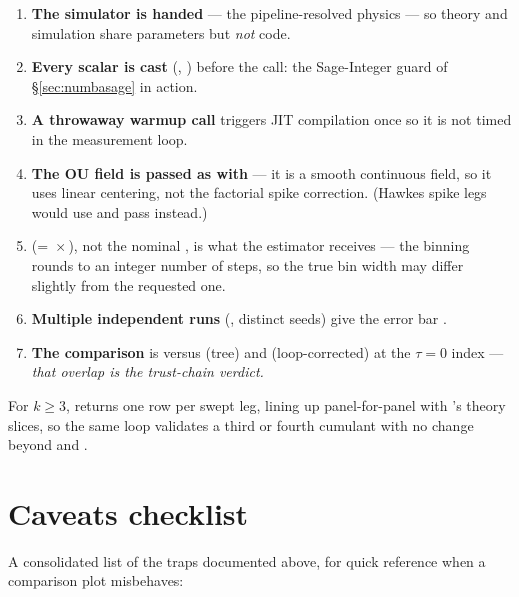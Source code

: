 \begin{enumerate}
  \item \textbf{The simulator is handed } ---
        the pipeline-resolved physics --- so theory and simulation share parameters
        but \emph{not} code.
  \item \textbf{Every scalar is cast} (, )
        before the  call: the Sage-Integer guard of \S\ref{sec:numbasage}
        in action.
  \item \textbf{A throwaway warmup call} triggers JIT compilation once so it is not
        timed in the measurement loop.
  \item \textbf{The OU field is passed as  with
        } --- it is a smooth continuous field, so it uses
        linear centering, not the factorial spike correction. (Hawkes spike legs
        would use  and pass  instead.)
  \item \textbf{} (= \,$\times$\,),
        not the nominal , is what the estimator receives --- the
        binning rounds  to an integer number of steps, so the
        true bin width may differ slightly from the requested one.
  \item \textbf{Multiple independent runs} (, distinct seeds) give the
        error bar .
  \item \textbf{The comparison} is  versus 
        (tree) and  (loop-corrected) at the $\tau=0$ index ---
        \emph{that overlap is the trust-chain verdict.}
\end{enumerate}

For $k\ge 3$,  returns one row per swept leg, lining
up panel-for-panel with 's theory slices, so the same loop
validates a third or fourth cumulant with no change beyond  and
.

\section{Caveats checklist}

A consolidated list of the traps documented above, for quick reference when a
comparison plot misbehaves:

